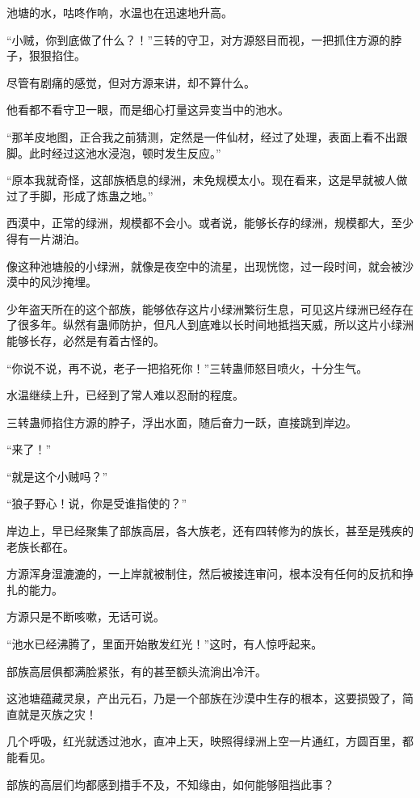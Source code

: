 
\begin{this_body}

池塘的水，咕咚作响，水温也在迅速地升高。

“小贼，你到底做了什么？！”三转的守卫，对方源怒目而视，一把抓住方源的脖子，狠狠掐住。

尽管有剧痛的感觉，但对方源来讲，却不算什么。

他看都不看守卫一眼，而是细心打量这异变当中的池水。

“那羊皮地图，正合我之前猜测，定然是一件仙材，经过了处理，表面上看不出跟脚。此时经过这池水浸泡，顿时发生反应。”

“原本我就奇怪，这部族栖息的绿洲，未免规模太小。现在看来，这是早就被人做过了手脚，形成了炼蛊之地。”

西漠中，正常的绿洲，规模都不会小。或者说，能够长存的绿洲，规模都大，至少得有一片湖泊。

像这种池塘般的小绿洲，就像是夜空中的流星，出现恍惚，过一段时间，就会被沙漠中的风沙掩埋。

少年盗天所在的这个部族，能够依存这片小绿洲繁衍生息，可见这片绿洲已经存在了很多年。纵然有蛊师防护，但凡人到底难以长时间地抵挡天威，所以这片小绿洲能够长存，必然是有着古怪的。

“你说不说，再不说，老子一把掐死你！”三转蛊师怒目喷火，十分生气。

水温继续上升，已经到了常人难以忍耐的程度。

三转蛊师掐住方源的脖子，浮出水面，随后奋力一跃，直接跳到岸边。

“来了！”

“就是这个小贼吗？”

“狼子野心！说，你是受谁指使的？”

岸边上，早已经聚集了部族高层，各大族老，还有四转修为的族长，甚至是残疾的老族长都在。

方源浑身湿漉漉的，一上岸就被制住，然后被接连审问，根本没有任何的反抗和挣扎的能力。

方源只是不断咳嗽，无话可说。

“池水已经沸腾了，里面开始散发红光！”这时，有人惊呼起来。

部族高层俱都满脸紧张，有的甚至额头流淌出冷汗。

这池塘蕴藏灵泉，产出元石，乃是一个部族在沙漠中生存的根本，这要损毁了，简直就是灭族之灾！

几个呼吸，红光就透过池水，直冲上天，映照得绿洲上空一片通红，方圆百里，都能看见。

部族的高层们均都感到措手不及，不知缘由，如何能够阻挡此事？


\end{this_body}
